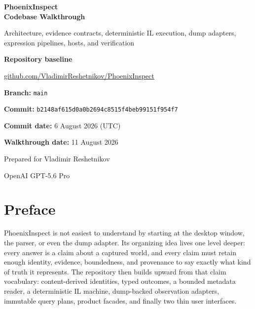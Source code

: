 \documentclass[11pt,oneside,openany]{book}
\newcommand{\commit}{\texttt{b2148af615d0a0b2694c8515f4beb99151f954f7}}
\begin{document}
\frontmatter

\begin{titlepage}
\pagecolor{PhoenixPaper}
\color{PhoenixInk}

\vspace*{30mm}
{\sffamily\bfseries\fontsize{34}{39}\selectfont PhoenixInspect\\[2mm]Codebase Walkthrough\par}
\vspace{8mm}
{\sffamily\Large Architecture, evidence contracts, deterministic IL execution, dump adapters, expression pipelines, hosts, and verification\par}

\vfill
\begin{tcolorbox}[colback=white,colframe=PhoenixRule,width=0.90\textwidth]
\textbf{Repository baseline}\par
\href{https://github.com/VladimirReshetnikov/PhoenixInspect}{github.com/VladimirReshetnikov/PhoenixInspect}\par
\textbf{Branch:} \texttt{main}\par
\textbf{Commit:} \commit\par
\textbf{Commit date:} 6 August 2026 (UTC)\par
\textbf{Walkthrough date:} 11 August 2026
\end{tcolorbox}

\vspace{8mm}
{\large Prepared for Vladimir Reshetnikov\par}
{\small OpenAI GPT-5.6 Pro\par}
\end{titlepage}
\nopagecolor

\chapter*{Preface}

PhoenixInspect is not easiest to understand by starting at the desktop window, the parser, or even the dump adapter. Its organizing idea lives one level deeper: every answer is a claim about a captured world, and every claim must retain enough identity, evidence, boundedness, and provenance to say exactly what kind of truth it represents. The repository then builds upward from that claim vocabulary: content-derived identities, typed outcomes, a bounded metadata reader, a deterministic IL machine, dump-backed observation adapters, immutable query plans, product facades, and finally two thin user interfaces.
\end{document}
